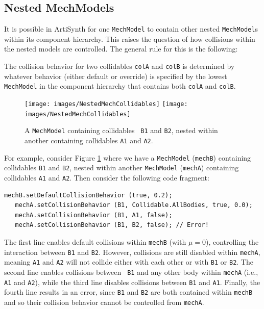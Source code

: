 \subsection{Nested MechModels}

It is possible in ArtiSynth for one {\tt MechModel} to contain other
nested {\tt MechModel}s within its component hierarchy. This raises
the question of how collisions within the nested models are
controlled. The general rule for this is the following:

\begin{sideblock}
The collision behavior for two collidables {\tt colA} and {\tt colB}
is determined by whatever behavior (either default or override) is
specified by the lowest {\tt MechModel} in the component hierarchy
that contains both {\tt colA} and {\tt colB}.
\end{sideblock}

\begin{figure}[ht]
\begin{center}
 \iflatexml
   \texttt{[image: images/NestedMechCollidables]}
 \else
   \texttt{[image: images/NestedMechCollidables]}
 \fi
\end{center}
\caption{A {\tt MechModel} containing collidables {\tt
B1} and {\tt B2}, nested within another
containing collidables {\tt A1} and {\tt A2}.}
\label{NestedMechCollidables:fig}
\end{figure}

For example, consider Figure \ref{NestedMechCollidables:fig} where we
have a {\tt MechModel} ({\tt mechB}) containing collidables {\tt B1} and
{\tt B2}, nested within another {\tt MechModel} ({\tt mechA})
containing collidables {\tt A1} and {\tt A2}. Then consider the
following code fragment:
%
\begin{lstlisting}[]
   mechB.setDefaultCollisionBehavior (true, 0.2);
   mechA.setCollisionBehavior (B1, Collidable.AllBodies, true, 0.0);
   mechA.setCollisionBehavior (B1, A1, false);
   mechA.setCollisionBehavior (B1, B2, false); // Error!
\end{lstlisting}
%
The first line enables default collisions within {\tt mechB} (with
$\mu = 0$), controlling the interaction between {\tt B1} and {\tt B2}.
However, collisions are still disabled within {\tt mechA}, meaning
{\tt A1} and {\tt A2} will not collide either with each other or with
{\tt B1} or {\tt B2}.  The second line enables collisions between {\tt
B1} and any other body within {\tt mechA} (i.e., {\tt A1} and
{\tt A2}), while the third line disables collisions between {\tt B1}
and {\tt A1}.  Finally, the fourth line results in an error, since
{\tt B1} and {\tt B2} are both contained within {\tt mechB} and so
their collision behavior cannot be controlled from {\tt mechA}.

